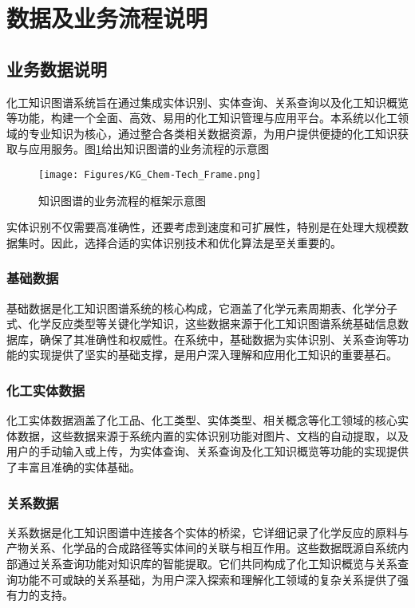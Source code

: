 \section{数据及业务流程说明}
\subsection{业务数据说明} 
化工知识图谱系统旨在通过集成实体识别、实体查询、关系查询以及化工知识概览等功能，构建一个全面、高效、易用的化工知识管理与应用平台。本系统以化工领域的专业知识为核心，通过整合各类相关数据资源，为用户提供便捷的化工知识获取与应用服务。图\ref{Fig:KG_Chem-Tech_Frame}给出知识图谱的业务流程的示意图%
\begin{figure}[h!]
\centering
\texttt{[image: Figures/KG\_Chem-Tech\_Frame.png]}
\caption{\small\textrm{知识图谱的业务流程的框架示意图}}%
\label{Fig:KG_Chem-Tech_Frame}
\end{figure}
实体识别不仅需要高准确性，还要考虑到速度和可扩展性，特别是在处理大规模数据集时。因此，选择合适的实体识别技术和优化算法是至关重要的。

\subsubsection{基础数据} 
基础数据是化工知识图谱系统的核心构成，它涵盖了化学元素周期表、化学分子式、化学反应类型等关键化学知识，这些数据来源于化工知识图谱系统基础信息数据库，确保了其准确性和权威性。在系统中，基础数据为实体识别、关系查询等功能的实现提供了坚实的基础支撑，是用户深入理解和应用化工知识的重要基石。

\subsubsection{化工实体数据} 
化工实体数据涵盖了化工品、化工类型、实体类型、相关概念等化工领域的核心实体数据，这些数据来源于系统内置的实体识别功能对图片、文档的自动提取，以及用户的手动输入或上传，为实体查询、关系查询及化工知识概览等功能的实现提供了丰富且准确的实体基础。

\subsubsection{关系数据} 
关系数据是化工知识图谱中连接各个实体的桥梁，它详细记录了化学反应的原料与产物关系、化学品的合成路径等实体间的关联与相互作用。这些数据既源自系统内部通过关系查询功能对知识库的智能提取。它们共同构成了化工知识概览与关系查询功能不可或缺的关系基础，为用户深入探索和理解化工领域的复杂关系提供了强有力的支持。

